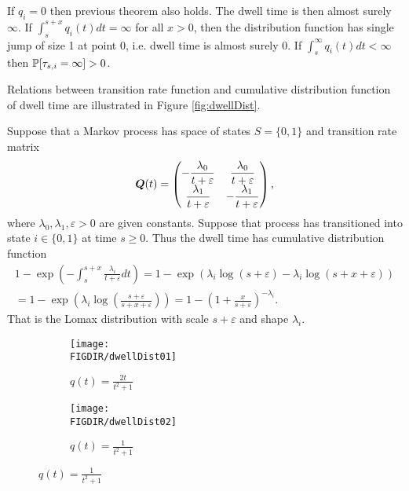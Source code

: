 {If $q_i = 0$ then previous theorem also holds. The dwell time is then almost surely $\infty$. If $\int_{s}^{s+x} q_i(t) dt = \infty$ for all $x>0$, then the distribution function has single jump of size 1 at point 0, i.e. dwell time is almost surely 0. If $\int_{s}^{\infty} q_i(t) dt < \infty$ then $\operatorname{\mathbb{P}} [ \tau_{s,i} = \infty] > 0$.

Relations between transition rate function and cumulative distribution function of dwell time are illustrated in Figure \ref{fig:dwellDist}.

\begin{example}
	Suppose that a Markov process has space of states $S = \{0,1\}$ and transition rate matrix
	\[
		\bm{Q} (t) = 
		\begin{pmatrix}
			-\dfrac{\lambda_{0}}{t+\varepsilon} & \dfrac{\lambda_{0}}{t+\varepsilon} \\
			\dfrac{\lambda_{1}}{t+\varepsilon} & -\dfrac{\lambda_{1}}{t+\varepsilon}
\end{pmatrix},
	\]
	where $\lambda_{0}, \lambda_{1}, \varepsilon > 0$ are given constants. Suppose that process has transitioned into state $i \in \{0,1\}$ at time $s \geq 0$. Thus the dwell time has cumulative distribution function
	\begin{multline*}
		1 - \exp \left(- \int_{s}^{s+x} \frac{\lambda_{i}}{t+\varepsilon} dt \right)
		= 1 - \exp \left(\lambda_{i} \log(s+\varepsilon) - \lambda_{i} \log(s+x+\varepsilon) \right) \\
		= 1 - \exp \left(\lambda_{i} \log \left( \frac{s+\varepsilon}{s+x+\varepsilon} \right) \right)
		= 1 - \left(1 + \frac{x}{s+\varepsilon} \right)^{-\lambda_{i}}.
	\end{multline*}
	That is the Lomax distribution with scale $s+\varepsilon$ and shape $\lambda_i$.
	\demo
\end{example}

\begin{figure}
	\centering
	
	\begin{subfigure}[b]{0.45\textwidth}
    \centering
		\texttt{[image: \\FIGDIR/dwellDist01]}
    \caption{$q(t) = \frac{2t}{t^2 + 1}$}
  \end{subfigure}
	\hfill
	\begin{subfigure}[b]{0.45\textwidth}
    \centering
		\texttt{[image: \\FIGDIR/dwellDist02]}
    \caption{$q(t) = \frac{1}{t^2 + 1}$}
  \end{subfigure}


\end{figure}}
